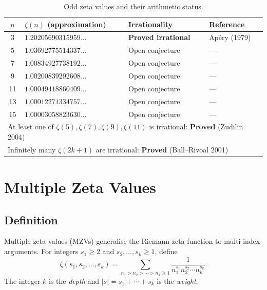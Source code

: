 \documentclass[12pt,a4paper]{amsart}
\theoremstyle{definition}
\theoremstyle{remark}
\begin{document}
\begin{table}[h]
  \centering
  \caption{Odd zeta values and their arithmetic status.}
  \vspace{4pt}
  \begin{tabular}{@{}clll@{}}
    \toprule
    $n$ & $\zeta(n)$ (approximation) & Irrationality & Reference \\
    \midrule
    3  & $1.20205690315959\ldots$ & \textbf{Proved irrational} & Apéry (1979) \\
    5  & $1.03692775514337\ldots$ & Open conjecture           & --- \\
    7  & $1.00834927738192\ldots$ & Open conjecture           & --- \\
    9  & $1.00200839292608\ldots$ & Open conjecture           & --- \\
    11 & $1.00049418860409\ldots$ & Open conjecture           & --- \\
    13 & $1.00012271334757\ldots$ & Open conjecture           & --- \\
    15 & $1.00003058823630\ldots$ & Open conjecture           & --- \\
    \midrule
    \multicolumn{4}{l}{At least one of $\zeta(5), \zeta(7), \zeta(9), \zeta(11)$
    is irrational: \textbf{Proved} (Zudilin 2004)} \\
    \multicolumn{4}{l}{Infinitely many $\zeta(2k+1)$ are irrational: \textbf{Proved}
    (Ball--Rivoal 2001)} \\
    \bottomrule
  \end{tabular}
  \label{tab:odd-zeta}
\end{table}

\section{Multiple Zeta Values}

\subsection{Definition}

Multiple zeta values (MZVs) generalise the Riemann zeta function to multi-index
arguments. For integers $s_1 \geq 2$ and $s_2, \ldots, s_k \geq 1$, define
\[
  \zeta(s_1, s_2, \ldots, s_k) = \sum_{n_1 > n_2 > \cdots > n_k \geq 1}
  \frac{1}{n_1^{s_1} n_2^{s_2} \cdots n_k^{s_k}}.
\]
The integer $k$ is the \emph{depth} and $|s| = s_1 + \cdots + s_k$ is the
\emph{weight}.
\end{document}

